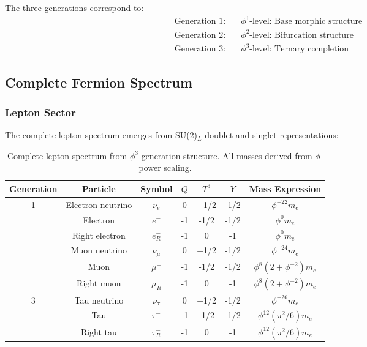 The three generations correspond to:
\begin{align}
\text{Generation 1:} &\quad \phi^1\text{-level: Base morphic structure}\\
\text{Generation 2:} &\quad \phi^2\text{-level: Bifurcation structure}\\
\text{Generation 3:} &\quad \phi^3\text{-level: Ternary completion}
\end{align}

\subsection{Complete Fermion Spectrum}

\subsubsection{Lepton Sector}

The complete lepton spectrum emerges from SU(2)$_L$ doublet and singlet representations:

\begin{table}[H]
\centering
\begin{tabular}{|c|c|c|c|c|c|c|}
\hline
\textbf{Generation} & \textbf{Particle} & \textbf{Symbol} & \textbf{$Q$} & \textbf{$T^3$} & \textbf{$Y$} & \textbf{Mass Expression} \\
\hline
\multirow{4}{*}{1} & Electron neutrino & $\nu_e$ & 0 & +1/2 & -1/2 & $\phi^{-22} m_e$ \\
& Electron & $e^-$ & -1 & -1/2 & -1/2 & $\phi^0 m_e$ \\
& Right electron & $e_R^-$ & -1 & 0 & -1 & $\phi^0 m_e$ \\
\hline
\multirow{4}{*}{2} & Muon neutrino & $\nu_\mu$ & 0 & +1/2 & -1/2 & $\phi^{-24} m_e$ \\
& Muon & $\mu^-$ & -1 & -1/2 & -1/2 & $\phi^8 (2 + \phi^{-2}) m_e$ \\
& Right muon & $\mu_R^-$ & -1 & 0 & -1 & $\phi^8 (2 + \phi^{-2}) m_e$ \\
\hline
\multirow{4}{*}{3} & Tau neutrino & $\nu_\tau$ & 0 & +1/2 & -1/2 & $\phi^{-26} m_e$ \\
& Tau & $\tau^-$ & -1 & -1/2 & -1/2 & $\phi^{12} (\pi^2/6) m_e$ \\
& Right tau & $\tau_R^-$ & -1 & 0 & -1 & $\phi^{12} (\pi^2/6) m_e$ \\
\hline
\end{tabular}
\caption{Complete lepton spectrum from $\phi^3$-generation structure. All masses derived from $\phi$-power scaling.}
\end{table}

